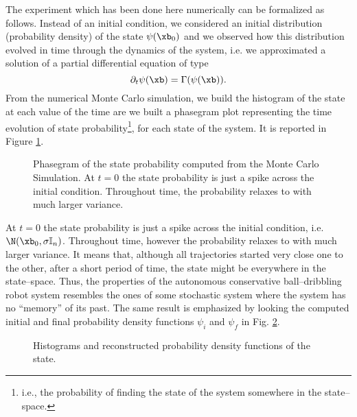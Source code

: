%
The experiment which has been done here numerically can be formalized as follows.
Instead of an initial condition, we considered an initial distribution (probability density) of the state $\psi(\xb_0)$ and we observed how this distribution evolved in time through the dynamics of the system, i.e. we approximated a solution of a partial differential equation of type
%
\begin{equation}
    \partial_t\psi(\xb) = \Gamma(\psi(\xb)).
\end{equation}
%
From the numerical Monte Carlo simulation, we build the histogram of the state at each value of the time are we built a phasegram plot representing the time evolution of state probability\footnote{i.e., the probability of finding the state of the system somewhere in the state--space.}, for each state of the system. It is reported in Figure \ref{fig:phasegram}. 
%
\begin{figure}[!ht]
    \centering
    \caption[Phasegram of the state probability function]{Phasegram of the state probability computed from the Monte Carlo Simulation. At $t=0$ the state probability is just a spike across the initial condition. Throughout time, the probability relaxes to with much larger variance.}
    \label{fig:phasegram}
\end{figure}
%
At $t=0$ the state probability is just a spike across the initial condition, i.e. $\N(\xb_0,\sigma\mathbb{I}_n)$. Throughout time, however the probability relaxes to with much larger variance. It means that, although all trajectories started very close one to the other, after a short period of time, the state might be everywhere in the state--space. Thus, the properties of the autonomous conservative ball--dribbling robot system resembles the ones of some stochastic system where the system has no ``memory'' of its past.
The same result is emphasized by looking the computed initial and final probability density functions $\psi_i$ and $\psi_f$ in Fig. \ref{fig:hist}.
%
\begin{figure}[!ht]
    \centering
    \caption{Histograms and reconstructed probability density functions of the state.}
    \label{fig:hist}
\end{figure}
%
\clearpage
